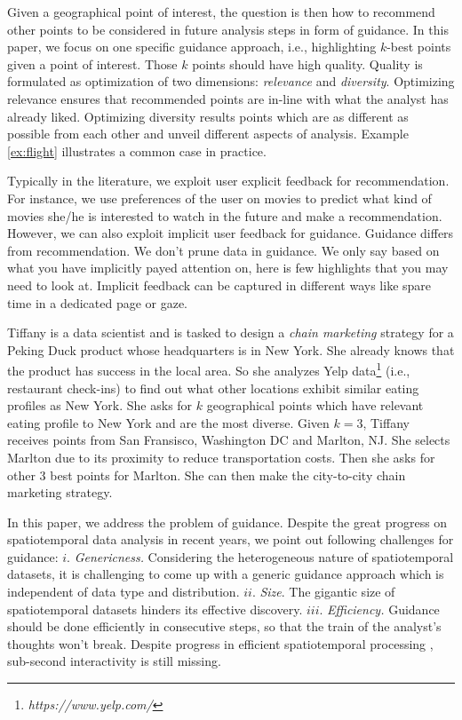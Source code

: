 Given a geographical point of interest, the question is then how to recommend other points to be considered in future analysis steps in form of guidance. In this paper, we focus on one specific guidance approach, i.e., highlighting $k$-best points given a point of interest. Those $k$ points should have high quality. Quality is formulated as optimization of two dimensions: {\em relevance} and {\em diversity}. Optimizing relevance ensures that recommended points are in-line with what the analyst has already liked. Optimizing diversity results points which are as different as possible from each other and unveil different aspects of analysis. Example \ref{ex:flight} illustrates a common case in practice.

Typically in the literature, we exploit user explicit feedback for recommendation. For instance, we use preferences of the user on movies to predict what kind of movies she/he is interested to watch in the future and make a recommendation. However, we can also exploit implicit user feedback for guidance. Guidance differs from recommendation. We don't prune data in guidance. We only say based on what you have implicitly payed attention on, here is few highlights that you may need to look at. Implicit feedback can be captured in different ways like spare time in a dedicated page or gaze.



\begin{example}
\label{ex:flight}
Tiffany is a data scientist and is tasked to design a {\em chain marketing} strategy for a Peking Duck product whose headquarters is in New York. She already knows that the product has success in the local area. So she analyzes Yelp data\footnote{\it https://www.yelp.com/} (i.e., restaurant check-ins) to find out what other locations exhibit similar eating profiles as New York. She asks for $k$ geographical points which have relevant eating profile to New York and are the most diverse. Given $k=3$, Tiffany receives points from San Fransisco, Washington DC and Marlton, NJ. She selects Marlton due to its proximity to reduce transportation costs. Then she asks for other 3 best points for Marlton. She can then make the city-to-city chain marketing strategy.
\end{example}

In this paper, we address the problem of guidance. Despite the great progress on spatiotemporal data analysis in recent years, we point out following challenges for guidance:
$i.$ {\em Genericness.} Considering the heterogeneous nature of spatiotemporal datasets, it is challenging to come up with a generic guidance approach which is independent of data type and distribution.
$ii.$ {\em Size}. The gigantic size of spatiotemporal datasets hinders its effective discovery. 
$iii.$ {\em Efficiency.} Guidance should be done efficiently in consecutive steps, so that the train of the analyst's thoughts won't break. Despite progress in efficient spatiotemporal processing \cite{yu2015geospark}, sub-second interactivity is still missing.


